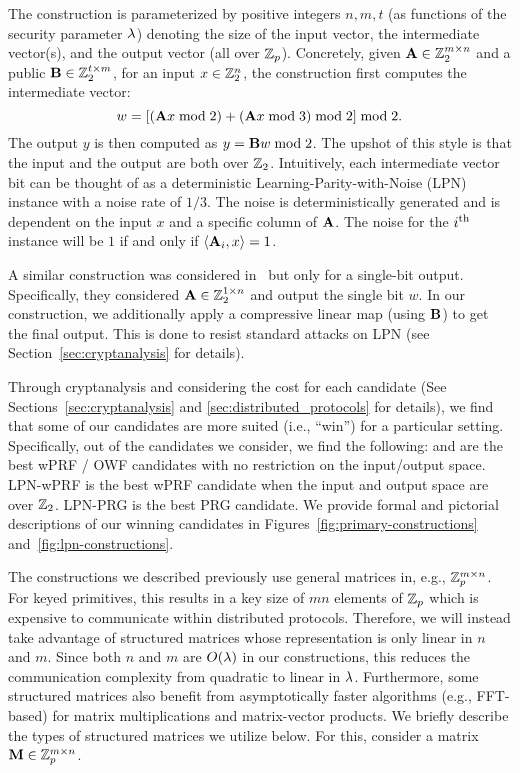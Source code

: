 \begin{itemize}
    \hspace*{1em} The construction is parameterized by positive integers $n,m,t$ (as functions of the security parameter $\lambda$) denoting the size of the input vector, the intermediate vector(s), and the output vector (all over $\mathbb{Z}_p$).
    Concretely, given $\mat{A} \in \Z_2^{m \times n}$ and a public $\mat{B} \in \Z_2^{t \times m}$, for an input $x \in \mathbb{Z}_2^n$, the construction first computes the intermediate vector:
   \[
        w = \left[(\mat{A}x \bmod 2) + (\mat{A}x \bmod 3) \bmod 2\right] \bmod 2.
    \]
    The output $y$ is then computed as $y = \mat{B}w \bmod 2$. The upshot of this style is that the input and the output are both over $\mathbb{Z}_2$. Intuitively, each intermediate vector bit can be thought of as a deterministic Learning-Parity-with-Noise (LPN) instance with a noise rate of $1/3$. The noise is deterministically generated and is dependent on the input $x$ and a specific column of $\mat{A}$. The noise for the $i^{\textnormal{th}}$ instance will be $1$ if and only if $\left<\mat{A}_i, x\right> = 1$.

    \hspace*{1em} A similar construction was considered in~\cite{boneh2018-darkmatter} but only for a single-bit output. Specifically, they considered $\mat{A} \in \Z_2^{1 \times n}$ and output the single bit $w$. In our construction, we additionally apply a compressive linear map (using $\mat{B}$) to get the final output. This is done to resist standard attacks on LPN (see Section~\ref{sec:cryptanalysis} for details).
\end{itemize}


Through cryptanalysis and considering the cost for each candidate (See Sections~\ref{sec:cryptanalysis} and \ref{sec:distributed_protocols} for details), we find that some of our candidates are more suited (i.e., ``win'') for a particular setting.
Specifically, out of the candidates we consider, we find the following: \ttwPRF and \ttOWF are the best wPRF / OWF candidates with no restriction on the input/output space. LPN-wPRF is the best wPRF candidate when the input and output space are over $\mathbb{Z}_2$. LPN-PRG is the best PRG candidate. We provide formal and pictorial descriptions of our winning candidates in Figures~\ref{fig:primary-constructions} and~\ref{fig:lpn-constructions}.

The constructions we described previously use general matrices in, e.g., $\mathbb{Z}_p^{m \times n}$. For keyed primitives, this results in a key size of $mn$ elements of $\mathbb{Z}_p$ which is expensive to communicate within distributed protocols. Therefore, we will instead take advantage of structured matrices whose representation is only linear in $n$ and $m$. Since both $n$ and $m$ are $O(\lambda)$ in our constructions, this reduces the communication complexity from quadratic to linear in $\lambda$. Furthermore, some structured matrices also benefit from asymptotically faster algorithms (e.g., FFT-based) for matrix multiplications and matrix-vector products. We briefly describe the types of structured matrices we utilize below. For this, consider a matrix $\mat{M} \in \Z_p^{m \times n}$.

